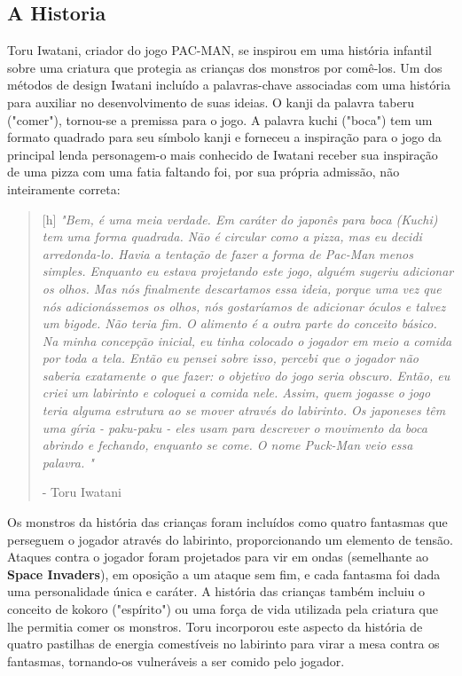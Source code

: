 \subsection{A Historia}\label{history}


Toru Iwatani, criador do jogo PAC-MAN, se inspirou em uma história infantil sobre uma criatura que protegia as crianças dos monstros por comê-los. Um dos métodos de design Iwatani incluído a palavras-chave associadas com uma história para auxiliar no desenvolvimento de suas ideias. O kanji da palavra taberu ("comer"), tornou-se a premissa para o jogo. A palavra kuchi ("boca") tem um formato quadrado para seu símbolo kanji e forneceu a inspiração para o jogo da principal lenda personagem-o mais conhecido de Iwatani receber sua inspiração de uma pizza com uma fatia faltando foi, por sua própria admissão, não inteiramente correta: 

\begin{quote}[h]
	\textit{"Bem, é uma meia verdade. Em caráter do japonês para boca (Kuchi) tem uma forma quadrada. Não é circular como a pizza, mas eu decidi arredonda-lo. Havia a tentação de fazer a forma de Pac-Man menos simples. Enquanto eu estava projetando este jogo, alguém sugeriu adicionar os olhos. Mas nós finalmente descartamos essa ideia, porque uma vez que nós adicionássemos os olhos, nós gostaríamos de adicionar óculos e talvez um bigode. Não teria fim. O alimento é a outra parte do conceito básico. Na minha concepção inicial, eu tinha colocado o jogador em meio a comida por toda a tela. Então eu pensei sobre isso, percebi que o jogador não saberia exatamente o que fazer: o objetivo do jogo seria obscuro. Então, eu criei um labirinto e coloquei a comida nele. Assim, quem jogasse o jogo teria alguma estrutura ao se mover através do labirinto. Os japoneses têm uma gíria - paku-paku - eles usam para descrever o movimento da boca abrindo e fechando, enquanto se come. O nome Puck-Man veio essa palavra. "}

- Toru Iwatani
\end{quote}

Os monstros da história das crianças foram incluídos como quatro fantasmas que perseguem o jogador através do labirinto, proporcionando um elemento de tensão. Ataques contra o jogador foram projetados para vir em ondas (semelhante ao \textbf{Space Invaders}), em oposição a um ataque sem fim, e cada fantasma foi dada uma personalidade única e caráter. A história das crianças também incluiu o conceito de kokoro ("espírito") ou uma força de vida utilizada pela criatura que lhe permitia comer os monstros. Toru incorporou este aspecto da história de quatro pastilhas de energia comestíveis no labirinto para virar a mesa contra os fantasmas, tornando-os vulneráveis ​​a ser comido pelo jogador.

